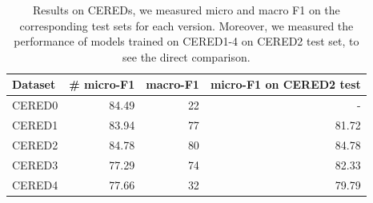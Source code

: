 \begin{table}[h]

\caption{Results on CEREDs, we measured micro and macro F1 on the corresponding test sets for each version. Moreover, we measured the performance of models trained on CERED1-4 on CERED2 test set, to see the direct comparison.}

\label{table01:S10T8}

\begin{tabular}{p{} r r r }

\hline
Dataset & \# micro-F1 & macro-F1 & micro-F1 on CERED2 test \\
\hline
\hline
CERED0 & 84.49 & 22 & -\\
CERED1 & 83.94 & 77 & 81.72 \\
CERED2 & 84.78 & 80 & 84.78 \\
CERED3 & 77.29 & 74 & 82.33 \\
CERED4 & 77.66 & 32 & 79.79 \\
\hline


\end{tabular}

\end{table}


